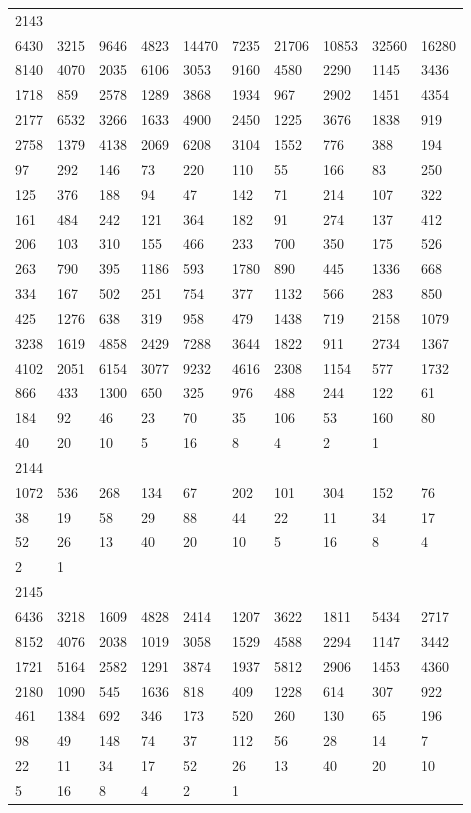 \begin{longtable}{*{10}{l}}
2143&&&&&&&&&\\
6430& 3215& 9646& 4823& 14470& 7235& 21706& 10853& 32560& 16280\\
8140& 4070& 2035& 6106& 3053& 9160& 4580& 2290& 1145& 3436\\
1718& 859& 2578& 1289& 3868& 1934& 967& 2902& 1451& 4354\\
2177& 6532& 3266& 1633& 4900& 2450& 1225& 3676& 1838& 919\\
2758& 1379& 4138& 2069& 6208& 3104& 1552& 776& 388& 194\\
97& 292& 146& 73& 220& 110& 55& 166& 83& 250\\
125& 376& 188& 94& 47& 142& 71& 214& 107& 322\\
161& 484& 242& 121& 364& 182& 91& 274& 137& 412\\
206& 103& 310& 155& 466& 233& 700& 350& 175& 526\\
263& 790& 395& 1186& 593& 1780& 890& 445& 1336& 668\\
334& 167& 502& 251& 754& 377& 1132& 566& 283& 850\\
425& 1276& 638& 319& 958& 479& 1438& 719& 2158& 1079\\
3238& 1619& 4858& 2429& 7288& 3644& 1822& 911& 2734& 1367\\
4102& 2051& 6154& 3077& 9232& 4616& 2308& 1154& 577& 1732\\
866& 433& 1300& 650& 325& 976& 488& 244& 122& 61\\
184& 92& 46& 23& 70& 35& 106& 53& 160& 80\\
40& 20& 10& 5& 16& 8& 4& 2& 1& \\

2144&&&&&&&&&\\
1072& 536& 268& 134& 67& 202& 101& 304& 152& 76\\
38& 19& 58& 29& 88& 44& 22& 11& 34& 17\\
52& 26& 13& 40& 20& 10& 5& 16& 8& 4\\
2& 1& \\

2145&&&&&&&&&\\
6436& 3218& 1609& 4828& 2414& 1207& 3622& 1811& 5434& 2717\\
8152& 4076& 2038& 1019& 3058& 1529& 4588& 2294& 1147& 3442\\
1721& 5164& 2582& 1291& 3874& 1937& 5812& 2906& 1453& 4360\\
2180& 1090& 545& 1636& 818& 409& 1228& 614& 307& 922\\
461& 1384& 692& 346& 173& 520& 260& 130& 65& 196\\
98& 49& 148& 74& 37& 112& 56& 28& 14& 7\\
22& 11& 34& 17& 52& 26& 13& 40& 20& 10\\
5& 16& 8& 4& 2& 1& \\


\end{longtable}
